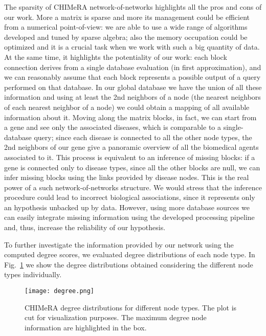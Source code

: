 \documentclass{standalone}
\begin{document}
The sparsity of \textsf{CHIMeRA} network-of-networks highlights all the pros and cons of our work.
More a matrix is sparse and more its management could be efficient from a numerical point-of-view: we are able to use a wide range of algorithms developed and tuned by sparse algebra; also the memory occupation could be optimized and it is a crucial task when we work with such a big quantity of data.
At the same time, it highlights the potentiality of our work: each block connection derives from a single database evaluation (in first approximation), and we can reasonably assume that each block represents a possible output of a query performed on that database.
In our global database we have the union of all these information and using at least the 2nd neighbors of a node (the nearest neighbors of each nearest neighbor of a node) we could obtain a mapping of all available information about it.
Moving along the matrix blocks, in fact, we can start from a gene and see only the associated diseases, which is comparable to a single-database query; since each disease is connected to all the other node types, the 2nd neighbors of our gene give a panoramic overview of all the biomedical agents associated to it.
This process is equivalent to an inference of missing blocks: if a gene is connected only to disease types, since all the other blocks are null, we can infer missing blocks using the links provided by disease nodes.
This is the real power of a such network-of-networks structure.
We would stress that the inference procedure could lead to incorrect biological associations, since it represents only an hypothesis unbacked up by data.
However, using more database sources we can easily integrate missing information using the developed processing pipeline and, thus, increase the reliability of our hypothesis.

To further investigate the information provided by our network using the computed degree scores, we evaluated degree distributions of each node type.
In Fig.~\ref{fig:chimera_degree} we show the degree distributions obtained considering the different node types individually.

\begin{figure}[htbp]
\centering
\texttt{[image: degree.png]}
\caption{\textsf{CHIMeRA} degree distributions for different node types.
The plot is cut for visualization purposes.
The maximum degree node information are highlighted in the box.
}
\label{fig:chimera_degree}
\end{figure}
\end{document}
